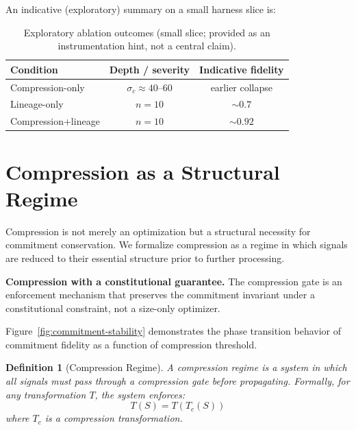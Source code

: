 \documentclass[11pt,a4paper]{article}
\newtheorem{definition}[theorem]{Definition}
\begin{document}
An indicative (exploratory) summary on a small harness slice is:
\begin{table}[htbp]
\centering
\begin{tabular}{lcc}
\toprule
\textbf{Condition} & \textbf{Depth / severity} & \textbf{Indicative fidelity} \\
\midrule
Compression-only & $\sigma_c \approx 40$--$60$ & earlier collapse \\
Lineage-only & $n=10$ & $\sim 0.7$ \\
Compression+lineage & $n=10$ & $\sim 0.92$ \\
\bottomrule
\end{tabular}
\caption{Exploratory ablation outcomes (small slice; provided as an instrumentation hint, not a central claim).}
\label{tab:ablation-hint}
\end{table}

\section{Compression as a Structural Regime}
\label{sec:compression}

Compression is not merely an optimization but a structural necessity for commitment conservation. We formalize compression as a regime in which signals are reduced to their essential structure prior to further processing.

\noindent\textbf{Compression with a constitutional guarantee.} The compression gate is an enforcement mechanism that preserves the commitment invariant under a constitutional constraint, not a size-only optimizer.

Figure~\ref{fig:commitment-stability} demonstrates the phase transition behavior of commitment fidelity as a function of compression threshold.



\begin{definition}[Compression Regime]
A compression regime is a system in which all signals must pass through a compression gate before propagating. Formally, for any transformation $T$, the system enforces:
\begin{equation}
T(S) = T(T_c(S))
\end{equation}
where $T_c$ is a compression transformation.
\end{definition}
\end{document}
